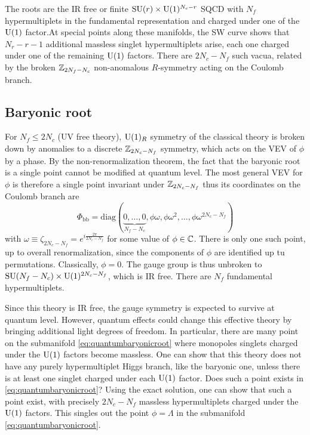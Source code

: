         The roots are the IR free or finite $\text{SU}(r)\times\text{U}(1)^{N_c-r}$ SQCD with $N_f$ hypermultiplets in the fundamental representation and charged under one of the $\text{U}(1)$ factor.At special points along these manifolds, the SW curve shows that $N_r-r-1$ additional massless singlet hypermultiplets arise, each one charged under one of the remaining $\text{U}(1)$ factors. There are $2N_c-N_f$ such vacua, related by the broken $\mathbb{Z}_{2N_f-N_c}$ non-anomalous $R$-symmetry acting on the Coulomb branch.

    \subsection{Baryonic root}

        For $N_f\leq 2N_c$ (UV free theory), $\text{U}(1)_R$ symmetry of the classical theory is broken down by anomalies to a discrete $\mathbb{Z}_{2N_c-N_f}$ symmetry, which acts on the VEV of $\phi$ by a phase. By the non-renormalization theorem, the fact that the baryonic root is a single point cannot be modified at quantum level. The most general VEV for $\phi$ is therefore a single point invariant under $\mathbb{Z}_{2N_c-N_f}$ thus its coordinates on the Coulomb branch are
        \begin{equation}
            \Phi_{\text{bb}}=\text{diag}(\underbrace{0,\dots,0}_{N_f-N_c},\phi\omega,\phi\omega^2,\dots,\phi\omega^{2N_c-N_f})\label{eq:quantumbaryonicroot}
        \end{equation}
        with $\omega\equiv\zeta_{2N_c-N_f}=e^{i\frac{2\pi}{2N_c-N_f}}$ for some value of $\phi\in\mathbb{C}$. There is only one such point, up to overall renormalization, since the components of $\phi$ are identified up tu permutations. Classically, $\phi=0$. The gauge group is thus unbroken to $\text{SU}(N_f-N_c)\times\text{U}(1)^{2N_c-N_f}$, which is IR free. There are $N_f$ fundamental hypermultiplets. 
        
        Since this theory is IR free, the gauge symmetry is expected to survive at quantum level. However, quantum effects could change this effective theory by bringing additional light degrees of freedom. In particular, there are many point on the submanifold \eqref{eq:quantumbaryonicroot} where monopoles singlets charged under the $\text{U}(1)$ factors become massless. One can show that this theory does not have any purely hypermultiplet Higgs branch, like the baryonic one, unless there is at least one singlet charged under each $\text{U}(1)$ factor. Does such a point exists in \eqref{eq:quantumbaryonicroot}? Using the exact solution, one can show that such a point exist, with precisely $2N_c-N_f$ massless hypermultiplets charged under the $\text{U}(1)$ factors. This singles out the point $\phi=\Lambda$ in the submanifold \eqref{eq:quantumbaryonicroot}.

